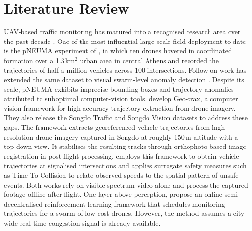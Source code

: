 \documentclass[12pt,oneside,bibtotoc,liststotoc]{scrbook}
\begin{document}
\chapter{Literature Review}
\label{chap:literature_review}

UAV-based traffic monitoring has matured into a recognised research area
over the past decade
\cite{barmpounakis2016UAVtransportEngineeringSurvey,outay2020UAVroadSafetyTrafficReview,liu2025skysEyePerspectiveUAVHighwayReview}.
One of the most influential large-scale field deployment to date is the pNEUMA
experiment of
\citet{barmpounakis2020pNEUMAdroneFieldExperiment}, in which ten drones
hovered in coordinated formation over a 1.3\,km$^2$ urban area in central
Athens and recorded the trajectories of half a million vehicles
across 100 intersections. Follow-on work has extended the same
dataset to visual swarm-level anomaly detection
\cite{kim2023visualExtensionsAnomalyDetectionSwarmDrones}. Despite its scale, pNEUMA exhibits imprecise bounding boxes and trajectory
anomalies attributed to suboptimal computer-vision tools.
\citet{fonod2025advancedComputerVisionVehicleTrajectoriesDroneImagery} develop
Geo-trax, a computer vision framework for high-accuracy trajectory extraction
from drone imagery. They also release the Songdo Traffic and Songdo Vision
datasets to address these gaps. The framework extracts georeferenced vehicle
trajectories from high-resolution drone imagery captured in Songdo at roughly
150\,m altitude with a top-down view. It stabilises the resulting tracks
through orthophoto-based image registration in post-flight processing.
\citet{espadaler2025accurateSafetyCongestionMonitoringFrameworkSwarmDrones}
employs this framework to obtain vehicle trajectories at signalised intersections
and applies surrogate safety measures such as Time-To-Collision to relate observed speeds to the spatial
pattern of unsafe events. Both works rely on visible-spectrum video alone and process the
captured footage offline after flight. One layer above perception,
\citet{maljkovic2025learningBasedTrafficMonitoringSwarmDrones} propose an
online semi-decentralised reinforcement-learning framework that schedules
monitoring trajectories for a swarm of low-cost drones. However, the method assumes a city-wide real-time congestion signal is
already available.
\end{document}
